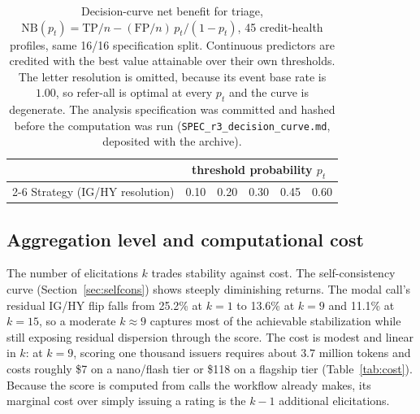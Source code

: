 \documentclass[a4paper,fleqn]{cas-sc}
\begin{document}
\begin{table}[t]\centering
\caption{Decision-curve net benefit for triage, $\mathrm{NB}(p_t)=\mathrm{TP}/n-(\mathrm{FP}/n)
\,p_t/(1-p_t)$, 45 credit-health profiles, same 16/16 specification split. Continuous predictors are credited with
the best value attainable over their own thresholds. The letter resolution is omitted, because its event base rate is $1.00$, so refer-all is optimal at every $p_t$ and the curve is degenerate. The analysis
specification was committed and hashed before the computation was run
(\texttt{SPEC\_r3\_decision\_curve.md}, deposited with the archive).}
\label{tab:sisdca}
\begin{tabular}{lccccc}\toprule
& \multicolumn{5}{c}{threshold probability $p_t$} \\\cmidrule(l){2-6}
Strategy (IG/HY resolution) & 0.10 & 0.20 & 0.30 & 0.45 & 0.60 \\\midrule%

\end{tabular}\end{table}

\subsection{Aggregation level and computational cost}\label{sec:sis-cost}
The number of elicitations $k$ trades stability against cost. The self-consistency curve
(Section~\ref{sec:selfcons}) shows steeply diminishing returns. The modal call's residual IG/HY flip
falls from 25.2\% at $k=1$ to 13.6\% at $k=9$ and 11.1\% at $k=15$, so a moderate $k\!\approx\!9$ captures
most of the achievable stabilization while still exposing residual dispersion through the score. The cost
is modest and linear in $k$: at $k=9$, scoring one thousand issuers requires about $3.7$ million tokens
and costs roughly \$7 on a nano/flash tier or \$118 on a flagship tier (Table~\ref{tab:cost}). Because the
score is computed from calls the workflow already makes, its marginal cost over simply issuing a rating is
the $k-1$ additional elicitations.
\end{document}
